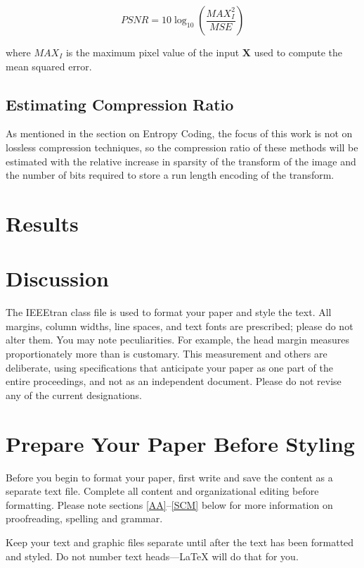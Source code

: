 \documentclass[conference]{IEEEtran}
\begin{document}
\begin{equation}
    PSNR = 10\log_{10}\left(\frac{MAX_I^2}{MSE}\right)
\end{equation}

where $MAX_I$ is the maximum pixel value of the input $\mathbf{X}$ used to compute the mean squared error.

\subsection{Estimating Compression Ratio}

As mentioned in the section on Entropy Coding, the focus of this work is not on lossless compression techniques, so the compression ratio of these methods will be estimated with the relative increase in sparsity of the transform of the image and the number of bits required to store a run length encoding of the transform.

\section{Results}

\section{Discussion}

The IEEEtran class file is used to format your paper and style the text. All margins,
column widths, line spaces, and text fonts are prescribed; please do not
alter them. You may note peculiarities. For example, the head margin
measures proportionately more than is customary. This measurement
and others are deliberate, using specifications that anticipate your paper
as one part of the entire proceedings, and not as an independent document.
Please do not revise any of the current designations.

\section{Prepare Your Paper Before Styling}
Before you begin to format your paper, first write and save the content as a
separate text file. Complete all content and organizational editing before
formatting. Please note sections \ref{AA}--\ref{SCM} below for more information on
proofreading, spelling and grammar.

Keep your text and graphic files separate until after the text has been
formatted and styled. Do not number text heads---{\LaTeX} will do that
for you.
\end{document}
